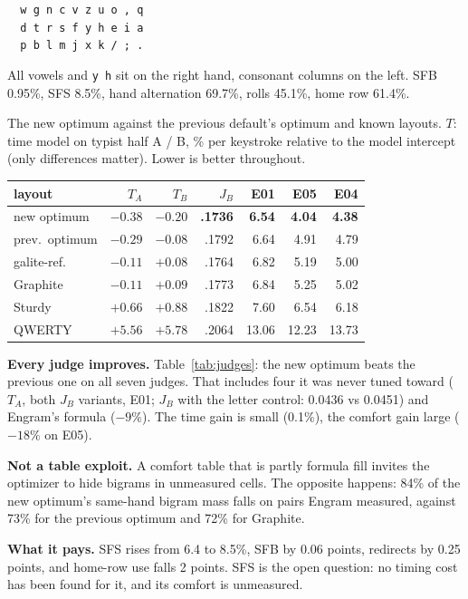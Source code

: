 \documentclass{gecko-paper}
\begin{document}
\begin{paperbody}
\smallskip
\noindent\texttt{\ \ w g n c v z u o , q}\\
\texttt{\ \ d t r s f y h e i a}\\
\texttt{\ \ p b l m j x k / ; .}
\smallskip

All vowels and \texttt{y h} sit on the right hand, consonant columns on the left. SFB 0.95\%, SFS 8.5\%, hand alternation 69.7\%, rolls 45.1\%, home row 61.4\%.

\begin{papertable}{The new optimum against the previous default's optimum and known layouts. $T$: time model on typist half A / B, \% per keystroke relative to the model intercept (only differences matter). Lower is better throughout.\label{tab:judges}}
\small\setlength{\tabcolsep}{2.5pt}
\begin{tabular*}{\linewidth}{@{\extracolsep{\fill}}lrrrrrr@{}}
\toprule
layout & $T_A$ & $T_B$ & $J_B$ & E01 & E05 & E04\\
\midrule
new optimum & $\mathbf{-0.38}$ & $\mathbf{-0.20}$ & \textbf{.1736} & \textbf{6.54} & \textbf{4.04} & \textbf{4.38}\\
prev.\ optimum & $-0.29$ & $-0.08$ & .1792 & 6.64 & 4.91 & 4.79\\
galite-ref. & $-0.11$ & $+0.08$ & .1764 & 6.82 & 5.19 & 5.00\\
Graphite & $-0.11$ & $+0.09$ & .1773 & 6.84 & 5.25 & 5.02\\
Sturdy & $+0.66$ & $+0.88$ & .1822 & 7.60 & 6.54 & 6.18\\
QWERTY & $+5.56$ & $+5.78$ & .2064 & 13.06 & 12.23 & 13.73\\
\bottomrule
\end{tabular*}
\end{papertable}

\textbf{Every judge improves.} Table~\ref{tab:judges}: the new optimum beats the previous one on all seven judges. That includes four it was never tuned toward ($T_A$, both $J_B$ variants, E01; $J_B$ with the letter control: 0.0436 vs 0.0451) and Engram's formula ($-9\%$). The time gain is small (0.1\%), the comfort gain large ($-18\%$ on E05).

\textbf{Not a table exploit.} A comfort table that is partly formula fill invites the optimizer to hide bigrams in unmeasured cells. The opposite happens: 84\% of the new optimum's same-hand bigram mass falls on pairs Engram measured, against 73\% for the previous optimum and 72\% for Graphite.

\textbf{What it pays.} SFS rises from 6.4 to 8.5\%, SFB by 0.06 points, redirects by 0.25 points, and home-row use falls 2 points. SFS is the open question: no timing cost has been found for it, and its comfort is unmeasured.


\end{paperbody}
\end{document}
